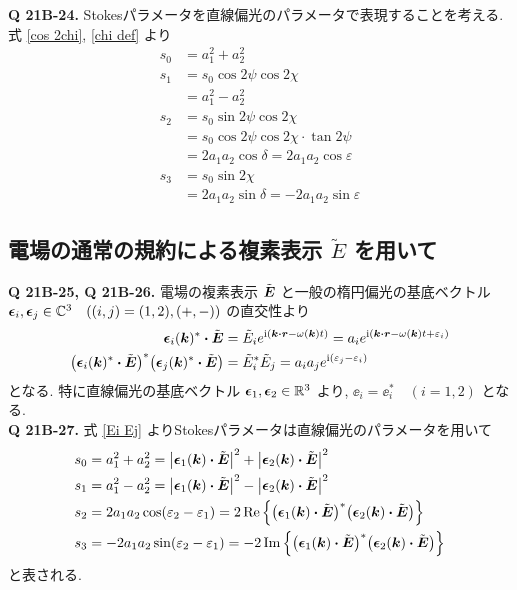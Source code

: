 \documentclass[a4paper,dvipdfmx]{jsarticle}
\theoremstyle{definition}
\begin{document}
\textbf{Q 21B-24.}
Stokesパラメータを直線偏光のパラメータで表現することを考える. 式 \eqref{cos 2chi}, \eqref{chi def} より
\begin{align}
  s_0 & = a_1^2 + a_2^2                               \\
  s_1 & = s_0\cos2\psi\cos2\chi                       \\
      & = a_1^2 - a_2^2                               \\
  s_2 & = s_0\sin2\psi\cos2\chi                       \\
      & = s_0\cos2\psi\cos2\chi\cdot\tan2\psi         \\
      & = 2a_1a_2\cos\delta = 2a_1a_2\cos\varepsilon  \\
  s_3 & = s_0\sin2\chi                                \\
      & = 2a_1a_2\sin\delta = -2a_1a_2\sin\varepsilon
\end{align}

\subsection{電場の通常の規約による複素表示 $\tilde{E}$ を用いて}
\textbf{Q 21B-25, Q 21B-26.}
電場の複素表示 $\tilde{\vb*{E}}$ と一般の楕円偏光の基底ベクトル $\vb*{\epsilon}_i, \vb*{\epsilon}_j\in\mathbb{C}^3\quad ((i, j) = (1, 2), (+, -))$ の直交性より
\begin{align}
  \ee_i(\kk)^*\vdot\ET
   & = \Et_ie^{\ii(\kk\vdot\rr - \omega(\kk)t)} = a_ie^{\ii(\kk\vdot\rr - \omega(\kk)t + \varepsilon_i)} \\
  \qty(\ee_i(\kk)^*\vdot\ET)^*\qty(\ee_j(\kk)^*\vdot\ET)
   & = \Et_i^*\Et_j = a_ia_je^{\ii(\varepsilon_j - \varepsilon_i)} \label{Ei Ej}
\end{align}
となる. 特に直線偏光の基底ベクトル $\vb*{\epsilon}_1, \vb*{\epsilon}_2\in\mathbb{R}^3$ より, $\ee_i = \ee_i^*\quad(i=1,2)$ となる. \\

\textbf{Q 21B-27.}
式 \eqref{Ei Ej} よりStokesパラメータは直線偏光のパラメータを用いて
\begin{align}
  s_0 & = a_1^2 + a_2^2 = \qty|\ee_1(\kk)\vdot\ET|^2 + \qty|\ee_2(\kk)\vdot\ET|^2                                      \\
  s_1 & = a_1^2 - a_2^2 = \qty|\ee_1(\kk)\vdot\ET|^2 - \qty|\ee_2(\kk)\vdot\ET|^2                                      \\
  s_2 & = 2a_1a_2\cos(\varepsilon_2 - \varepsilon_1) = 2\Re\qty{\qty(\ee_1(\kk)\vdot\ET)^*\qty(\ee_2(\kk)\vdot\ET)}    \\
  s_3 & = - 2a_1a_2\sin(\varepsilon_2 - \varepsilon_1) = -2\Im\qty{\qty(\ee_1(\kk)\vdot\ET)^*\qty(\ee_2(\kk)\vdot\ET)}
\end{align}
と表される. \\
\end{document}
